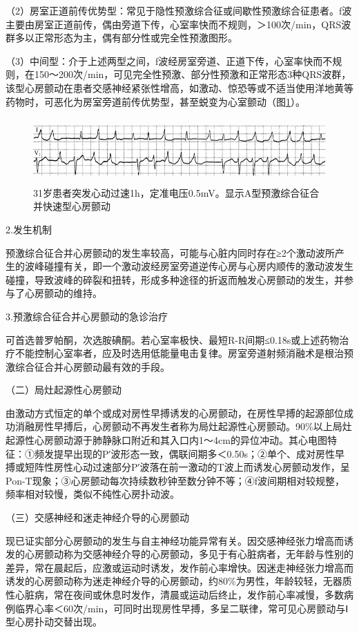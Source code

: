 （2）房室正道前传优势型：常见于隐性预激综合征或间歇性预激综合征患者。f波主要由房室正道前传，偶由旁道下传，心室率快而不规则，＞100次/min，QRS波群多以正常形态为主，偶有部分性或完全性预激图形。

（3）中间型：介于上述两型之间，f波经房室旁道、正道下传，心室率快而不规则，在150～200次/min，可见完全性预激、部分性预激和正常形态3种QRS波群，该型心房颤动在患者交感神经紧张性增高，如激动、惊恐等或不适当使用洋地黄等药物时，可恶化为房室旁道前传优势型，甚至蜕变为心室颤动（图\ref{fig13-29}）。

\begin{figure}[!htbp]
 \centering
 \includegraphics[width=5.58333in,height=0.97917in]{./images/Image00237.jpg}
 \captionsetup{justification=centering}
 \caption{31岁患者突发心动过速1h，定准电压0.5mV。显示A型预激综合征合并快速型心房颤动}
 \label{fig13-29}
  \end{figure} 

2.发生机制

预激综合征合并心房颤动的发生率较高，可能与心脏内同时存在≥2个激动波所产生的波峰碰撞有关，即一个激动波经房室旁道逆传心房与心房内顺传的激动波发生碰撞，导致波峰的碎裂和扭转，形成多种途径的折返而触发心房颤动的发生，并参与了心房颤动的维持。

3.预激综合征合并心房颤动的急诊治疗

可首选普罗帕酮，次选胺碘酮。若心室率极快、最短R-R间期≤0.18s或上述药物治疗不能控制心室率者，应及时选用低能量电击复律。房室旁道射频消融术是根治预激综合征合并心房颤动最有效的手段。

（二）局灶起源性心房颤动

由激动方式恒定的单个或成对房性早搏诱发的心房颤动，在房性早搏的起源部位成功消融房性早搏后，心房颤动不再发生者称为局灶起源性心房颤动。90\%以上局灶起源性心房颤动源于肺静脉口附近和其入口内1～4cm的异位冲动。其心电图特征：①频发提早出现的P′波形态一致，偶联间期多＜0.50s；②单个、成对房性早搏或短阵性房性心动过速部分P′波落在前一激动的T波上而诱发心房颤动发作，呈Pon-T现象；③心房颤动每次持续数秒钟至数分钟不等；④f波间期相对较规整，频率相对较慢，类似不纯性心房扑动波。

（三）交感神经和迷走神经介导的心房颤动

现已证实部分心房颤动的发生与自主神经功能异常有关。因交感神经张力增高而诱发的心房颤动称为交感神经介导的心房颤动，多见于有心脏病者，无年龄与性别的差异，常在晨起后，应激或运动时诱发，发作前心率增快。因迷走神经张力增高而诱发的心房颤动称为迷走神经介导的心房颤动，约80\%为男性，年龄较轻，无器质性心脏病，常在夜间或休息时发作，清晨或运动后终止，发作前心率减慢，多数病例临界心率＜60次/min，可同时出现房性早搏，多呈二联律，常可见心房颤动与Ⅰ型心房扑动交替出现。

